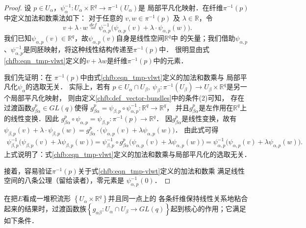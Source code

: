 \begin{proof}
设 $p \in U_\alpha$，$\psi_\alpha^{-1}: U_\alpha \times \mathbb{R}^q \rightarrow \pi^{-1} (U_\alpha)$是
局部平凡化映射．在纤维$\pi^{-1}(p)$中定义加法和数乘法如下：
对于任意的 $v, w \in \pi^{-1}(p)$ 及 $\lambda \in \mathbb{R}$，令
\begin{equation}\label{chfb:eqn_tmp-vlwt}
    v+\lambda \cdot w \overset{def}{=} \psi_{\alpha, p}^{-1} \bigl(\psi_{\alpha, p} (v)
    +\lambda \cdot \psi_{\alpha, p} (w)\bigr) .
\end{equation}
我们已知$\psi_{\alpha, p} (v)\in \mathbb{R}^q$，故$\psi_{\alpha, p} (v)$自身是线性空间$\mathbb{R}^q$中
的矢量；我们借助$\psi_{\alpha, p}$、$\psi_{\alpha, p}^{-1}$是同胚映射，将这种线性结构传递至$\pi^{-1}(p)$中．
很明显由式\eqref{chfb:eqn_tmp-vlwt}定义的$v+ \lambda w $是纤维$ \pi^{-1}(p)$中的元素．

我们先证明：在 $\pi^{-1}(p)$中由式\eqref{chfb:eqn_tmp-vlwt}定义的加法和数乘与
局部平凡化$\psi_\alpha$的选取无关．
实际上，若有 $p \in U_\alpha \cap U_\beta,\ \psi_\beta: \pi^{-1} (U_\beta )
 \rightarrow U_\beta \times \mathbb{R}^q $是另一个局部平凡化映射，
则由定义\ref{chfb:def_vector-bundles}中的条件(2)可知，
存在过渡函数$g_{\beta \alpha}^p \in GL(q)$使得
$g_{\beta \alpha}^p =\psi_{\beta, p} \circ \psi_{\alpha, p}^{-1}: \mathbb{R}^q \rightarrow \mathbb{R}^q $，
并且$g_{\beta \alpha}^p$是左作用在$\mathbb{R}^q$上的线性变换．因此
$g_{\beta \alpha}^p \circ \psi_{\alpha, p}=\psi_{\beta, p}: \pi^{-1}(p) \rightarrow \mathbb{R}^q $．
因$g_{\beta \alpha}^p$是线性变换，故有
$    \psi_{\beta, p}(v )+\lambda \cdot \psi_{\beta, p} (w)=
    g_{\beta \alpha}^p \cdot \bigl(\psi_{\alpha, p}(v)+ \lambda \psi_{\alpha, p} (w)\bigr) $．
由此式可得
\setlength{\mathindent}{0em}
\begin{align*}
    \psi_{\beta, p}^{-1} \bigl(\psi_{\beta, p} (v)+\lambda \psi_{\beta, p} (w)\bigr) 
    = \psi_{\beta, p}^{-1} \circ g_{\beta \alpha}^p \bigl(\psi_{\alpha, p}(v)+\lambda \psi_{\alpha, p}(w)\bigr)
    = \psi_{\alpha, p}^{-1} \bigl(\psi_{\alpha, p} (v)+\lambda \psi_{\alpha, p} (w)\bigr) .
\end{align*}\setlength{\mathindent}{2em}
上式说明了：式\eqref{chfb:eqn_tmp-vlwt}定义的加法和数乘与局部平凡化的选取无关．

接着，容易验证$\pi^{-1}(p)$关于式\eqref{chfb:eqn_tmp-vlwt}定义的加法和数乘
满足线性空间的八条公理（留给读者），零元素是 $\psi_{\alpha, p}^{-1}(0)$．
\end{proof}

在把$E$看成一堆积流形 $\left\{U_\alpha \times \mathbb{R}^q\right\}$并且同一点上的
各条纤维保持线性关系地粘合起来的结果时，过渡函数族$\left\{g_{\alpha \beta}: U_\alpha \cap U_\beta 
\rightarrow GL(q)\right\}$起到核心的作用；它满足如下条件．



